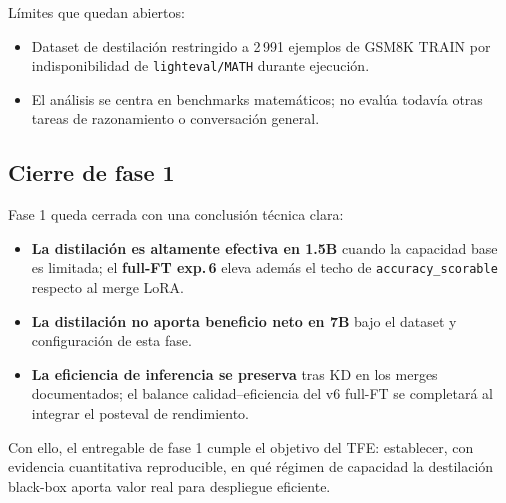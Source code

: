 \documentclass[11pt,a4paper]{article}
\begin{document}
L\'imites que quedan abiertos:
\begin{itemize}
  \item Dataset de destilaci\'on restringido a 2\,991 ejemplos de GSM8K
    TRAIN por indisponibilidad de \texttt{lighteval/MATH} durante ejecuci\'on.
  \item El an\'alisis se centra en benchmarks matem\'aticos; no eval\'ua
    todav\'ia otras tareas de razonamiento o conversaci\'on general.
\end{itemize}

\subsection{Cierre de fase 1}

Fase 1 queda cerrada con una conclusi\'on t\'ecnica clara:
\begin{itemize}
  \item \textbf{La distilaci\'on es altamente efectiva en 1.5B} cuando la
    capacidad base es limitada; el \textbf{full-FT exp.\,6} eleva adem\'as
    el techo de \texttt{accuracy\_scorable} respecto al merge LoRA.
  \item \textbf{La distilaci\'on no aporta beneficio neto en 7B} bajo el
    dataset y configuraci\'on de esta fase.
  \item \textbf{La eficiencia de inferencia se preserva} tras KD en los
    merges documentados; el balance calidad--eficiencia del v6 full-FT
    se completar\'a al integrar el posteval de rendimiento.
\end{itemize}

Con ello, el entregable de fase 1 cumple el objetivo del TFE: establecer,
con evidencia cuantitativa reproducible, en qu\'e r\'egimen de capacidad la
destilaci\'on black-box aporta valor real para despliegue eficiente.
\end{document}
